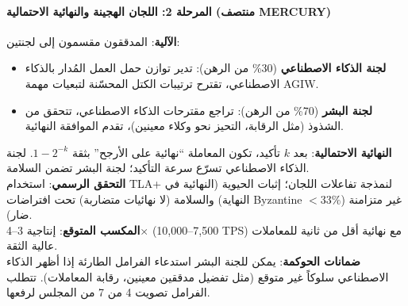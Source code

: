 \documentclass[11pt]{article}
\begin{document}
\paragraph{المرحلة 2: اللجان الهجينة والنهائية الاحتمالية (منتصف MERCURY)}
\textbf{الآلية}: المدققون مقسمون إلى لجنتين:
\begin{itemize}[noitemsep]
  \item \textbf{لجنة الذكاء الاصطناعي} (30\% من الرهن): تدير توازن حمل العمل المُدار بالذكاء الاصطناعي، تقترح ترتيبات الكتل المحسّنة لتبعيات مهمة AGIW.
  \item \textbf{لجنة البشر} (70\% من الرهن): تراجع مقترحات الذكاء الاصطناعي، تتحقق من الشذوذ (مثل الرقابة، التحيز نحو وكلاء معينين)، تقدم الموافقة النهائية.
\end{itemize}
\textbf{النهائية الاحتمالية}: بعد $k$ تأكيد، تكون المعاملة ``نهائية على الأرجح'' بثقة $1 - 2^{-k}$. لجنة الذكاء الاصطناعي تسرّع سرعة التأكيد؛ لجنة البشر تضمن السلامة.\\
\textbf{التحقق الرسمي}: استخدام TLA+ لنمذجة تفاعلات اللجان؛ إثبات الحيوية (النهائية في النهاية) والسلامة (لا نهائيات متضاربة) تحت افتراضات Byzantine غير متزامنة ($<33\%$ ضار).\\
\textbf{المكسب المتوقع}: إنتاجية 3--4$\times$ (7,500--10,000 TPS) مع نهائية أقل من ثانية للمعاملات عالية الثقة.\\
\textbf{ضمانات الحوكمة}: يمكن للجنة البشر استدعاء الفرامل الطارئة إذا أظهر الذكاء الاصطناعي سلوكاً غير متوقع (مثل تفضيل مدققين معينين، رقابة المعاملات). تتطلب الفرامل تصويت 4 من 7 من المجلس لرفعها.
\end{document}
